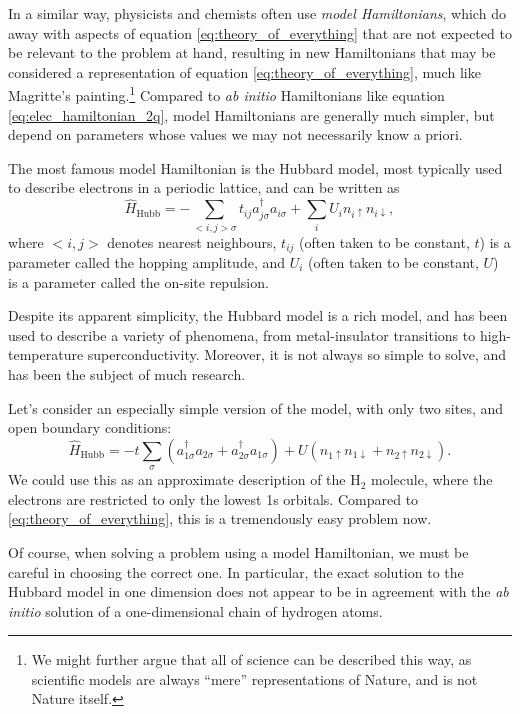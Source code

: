 In a similar way, physicists and chemists often use \emph{model Hamiltonians}, which do away with aspects of equation \eqref{eq:theory_of_everything} that are not expected to be relevant to the problem at hand, resulting in new Hamiltonians that may be considered a representation of equation \eqref{eq:theory_of_everything}, much like Magritte's painting.\footnote{We might further argue that all of science can be described this way, as scientific models are always ``mere'' representations of Nature, and is not Nature itself.} Compared to \emph{ab initio} Hamiltonians like equation \eqref{eq:elec_hamiltonian_2q}, model Hamiltonians are generally much simpler, but depend on parameters whose values we may not necessarily know a priori.

The most famous model Hamiltonian is the Hubbard model,\cite{Hubbard1963} most typically used to describe electrons in a periodic lattice, and can be written as
\begin{equation}
\label{eq:hubbard}
\hat H_\mathrm{Hubb} = - \sum_{<i,j>\sigma} t_{ij} a_{j\sigma}^\dag a_{i\sigma} + \sum_i U_in_{i\uparrow}n_{i\downarrow},
\end{equation}
where $<i,j>$ denotes nearest neighbours, $t_{ij}$ (often taken to be constant, $t$) is a parameter called the hopping amplitude, and $U_i$ (often taken to be constant, $U$) is a parameter called the on-site repulsion.

Despite its apparent simplicity, the Hubbard model is a rich model, and has been used to describe a variety of phenomena, from metal-insulator transitions to high-temperature superconductivity. Moreover, it is not always so simple to solve, and has been the subject of much research.\cite{Lieb1968a,liebermannFCIQMC2023}

Let's consider an especially simple version of the model, with only two sites, and open boundary conditions:
\begin{equation}
\label{eq:hubbard_h2}
\hat H_\mathrm{Hubb} = - t\sum_{\sigma}(a_{1\sigma}^\dag a_{2\sigma} + a_{2\sigma}^\dag a_{1\sigma}) + U(n_{1\uparrow}n_{1\downarrow}+n_{2\uparrow}n_{2\downarrow}).
\end{equation}
We could use this as an approximate description of the H$_2$ molecule, where the electrons are restricted to only the lowest 1s orbitals. Compared to \eqref{eq:theory_of_everything}, this is a tremendously easy problem now.

Of course, when solving a problem using a model Hamiltonian, we must be careful in choosing the correct one. In particular, the exact solution to the Hubbard model in one dimension\cite{Lieb1968a} does not appear to be in agreement with the \emph{ab initio} solution of a one-dimensional chain of hydrogen atoms.\cite{Motta2017,Motta2020}

